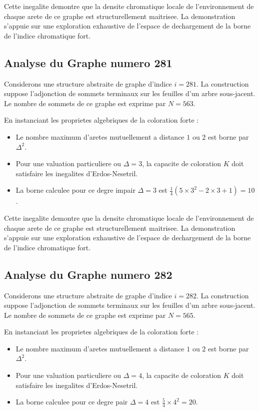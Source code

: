 \documentclass[11pt,a4paper]{article}
\begin{document}
Cette inegalite demontre que la densite chromatique locale de l'environnement de chaque arete de ce graphe est structurellement maitrisee. La demonstration s'appuie sur une exploration exhaustive de l'espace de dechargement de la borne de l'indice chromatique fort.

\subsection{Analyse du Graphe numero 281}
Considerons une structure abstraite de graphe d'indice $i = 281$. La construction suppose l'adjonction de sommets terminaux sur les feuilles d'un arbre sous-jacent. Le nombre de sommets de ce graphe est exprime par $N = 563$.

En instanciant les proprietes algebriques de la coloration forte :
\begin{itemize}
\item Le nombre maximum d'aretes mutuellement a distance $1$ ou $2$ est borne par $\Delta^2$.
\item Pour une valuation particuliere ou $\Delta = 3$, la capacite de coloration $K$ doit satisfaire les inegalites d'Erdos-Nesetril.
\item La borne calculee pour ce degre impair $\Delta = 3$ est $\frac{1}{4}(5 \times 3^2 - 2 \times 3 + 1) = 10$.
\end{itemize}

Cette inegalite demontre que la densite chromatique locale de l'environnement de chaque arete de ce graphe est structurellement maitrisee. La demonstration s'appuie sur une exploration exhaustive de l'espace de dechargement de la borne de l'indice chromatique fort.

\subsection{Analyse du Graphe numero 282}
Considerons une structure abstraite de graphe d'indice $i = 282$. La construction suppose l'adjonction de sommets terminaux sur les feuilles d'un arbre sous-jacent. Le nombre de sommets de ce graphe est exprime par $N = 565$.

En instanciant les proprietes algebriques de la coloration forte :
\begin{itemize}
\item Le nombre maximum d'aretes mutuellement a distance $1$ ou $2$ est borne par $\Delta^2$.
\item Pour une valuation particuliere ou $\Delta = 4$, la capacite de coloration $K$ doit satisfaire les inegalites d'Erdos-Nesetril.
\item La borne calculee pour ce degre pair $\Delta = 4$ est $\frac{5}{4} \times 4^2 = 20$.
\end{itemize}
\end{document}
